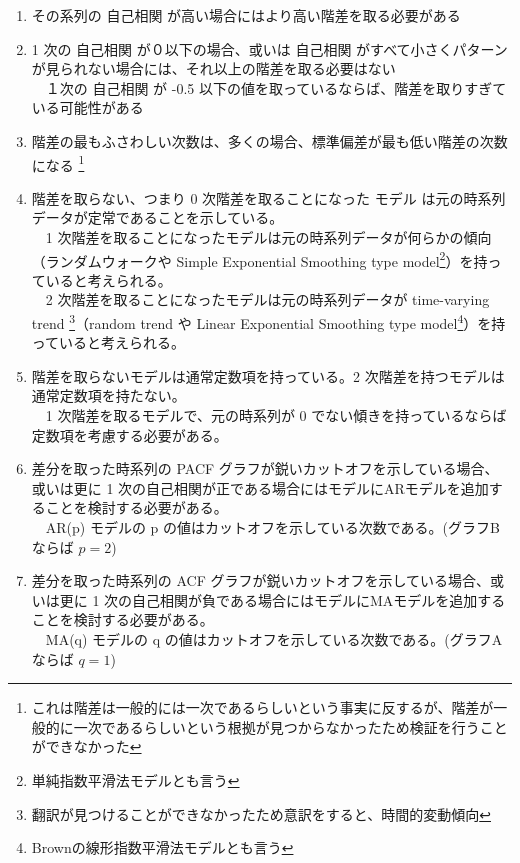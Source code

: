\documentclass[dvipdfmx]{scrartcl}
\begin{document}
\begin{enumerate}
\item その系列の 自己相関 が高い場合にはより高い階差を取る必要がある\\
\item 1 次の 自己相関 が０以下の場合、或いは 自己相関 がすべて小さくパターンが見られない場合には、それ以上の階差を取る必要はない\\
　１次の 自己相関 が -0.5 以下の値を取っているならば、階差を取りすぎている可能性がある\\
\item 階差の最もふさわしい次数は、多くの場合、標準偏差が最も低い階差の次数になる \footnote{これは階差は一般的には一次であるらしいという事実に反するが、階差が一般的に一次であるらしいという根拠が見つからなかったため検証を行うことができなかった}\\
\item 階差を取らない、つまり 0 次階差を取ることになった モデル は元の時系列データが定常であることを示している。\\
　1 次階差を取ることになったモデルは元の時系列データが何らかの傾向（ランダムウォークや Simple Exponential Smoothing type model\footnote{単純指数平滑法モデルとも言う}）を持っていると考えられる。\\
　2 次階差を取ることになったモデルは元の時系列データが time-varying trend \footnote{翻訳が見つけることができなかったため意訳をすると、時間的変動傾向}（random trend や Linear Exponential Smoothing type model\footnote{Brownの線形指数平滑法モデルとも言う}）を持っていると考えられる。\\
\item 階差を取らないモデルは通常定数項を持っている。2 次階差を持つモデルは通常定数項を持たない。\\
　1 次階差を取るモデルで、元の時系列が 0 でない傾きを持っているならば 定数項を考慮する必要がある。\\
\item 差分を取った時系列の PACF グラフが鋭いカットオフを示している場合、或いは更に 1 次の自己相関が正である場合にはモデルにARモデルを追加することを検討する必要がある。\\
　AR(p) モデルの p の値はカットオフを示している次数である。(グラフBならば \(p = 2\))\\
\item 差分を取った時系列の ACF グラフが鋭いカットオフを示している場合、或いは更に 1 次の自己相関が負である場合にはモデルにMAモデルを追加することを検討する必要がある。\\
　MA(q) モデルの q の値はカットオフを示している次数である。(グラフAならば \(q=1\))\\

\end{enumerate}
\end{document}
